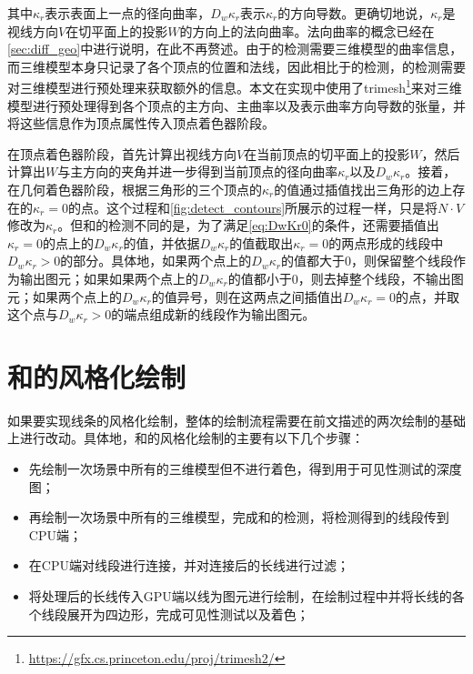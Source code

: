 其中$\kappa_r$表示表面上一点的径向曲率，$D_w\kappa_r$表示$\kappa_r$的方向导数。更确切地说，$\kappa_r$是视线方向$V$在切平面上的投影$W$的方向上的法向曲率。法向曲率的概念已经在\autoref{sec:diff_geo}中进行说明，在此不再赘述。由于\scon{}的检测需要三维模型的曲率信息，而三维模型本身只记录了各个顶点的位置和法线，因此相比于\con{}的检测，\scon{}的检测需要对三维模型进行预处理来获取额外的信息。本文在实现中使用了trimesh\footnote{\url{https://gfx.cs.princeton.edu/proj/trimesh2/}}来对三维模型进行预处理得到各个顶点的主方向、主曲率以及表示曲率方向导数的张量，并将这些信息作为顶点属性传入顶点着色器阶段。

在顶点着色器阶段，首先计算出视线方向$V$在当前顶点的切平面上的投影$W$，然后计算出$W$与主方向的夹角并进一步得到当前顶点的径向曲率$\kappa_r$以及$D_w\kappa_r$。接着，在几何着色器阶段，根据三角形的三个顶点的$\kappa_r$的值通过插值找出三角形的边上存在的$\kappa_r = 0$的点。这个过程和\autoref{fig:detect_contours}所展示的过程一样，只是将$N\cdot{V}$修改为$\kappa_r$。但和\con{}的检测不同的是，为了满足\autoref{eq:DwKr0}的条件，还需要插值出$\kappa_r = 0$的点上的$D_w\kappa_r$的值，并依据$D_w\kappa_r$的值截取出$\kappa_r = 0$的两点形成的线段中$D_w\kappa_r > 0$的部分。具体地，如果两个点上的$D_w\kappa_r$的值都大于0，则保留整个线段作为输出图元；如果如果两个点上的$D_w\kappa_r$的值都小于0，则去掉整个线段，不输出图元；如果两个点上的$D_w\kappa_r$的值异号，则在这两点之间插值出$D_w\kappa_r = 0$的点，并取这个点与$D_w\kappa_r > 0$的端点组成新的线段作为输出图元。

\section{\con{}和\scon{}的风格化绘制}

如果要实现线条的风格化绘制，整体的绘制流程需要在前文描述的两次绘制的基础上进行改动。具体地，\con{}和\scon{}的风格化绘制的主要有以下几个步骤：

\begin{itemize}
    \item 先绘制一次场景中所有的三维模型但不进行着色，得到用于可见性测试的深度图；
    \item 再绘制一次场景中所有的三维模型，完成\con{}和\scon{}的检测，将检测得到的线段传到CPU端；
    \item 在CPU端对线段进行连接，并对连接后的长线进行过滤；
    \item 将处理后的长线传入GPU端以线为图元进行绘制，在绘制过程中并将长线的各个线段展开为四边形，完成可见性测试以及着色；
\end{itemize}

